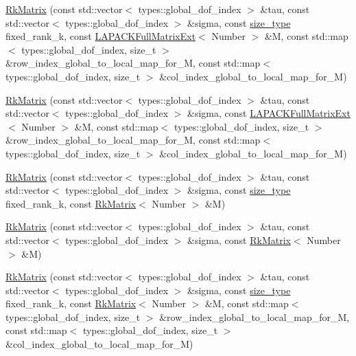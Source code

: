 \begin{DoxyCompactItemize}
\item 
\hyperlink{classRkMatrix_adf204b7ad92834e63c7f63f6b9ca59a9}{Rk\+Matrix} (const std\+::vector$<$ types\+::global\+\_\+dof\+\_\+index $>$ \&tau, const std\+::vector$<$ types\+::global\+\_\+dof\+\_\+index $>$ \&sigma, const \hyperlink{classRkMatrix_add060bfc3a4cc77f858c3d6dd58cadd5}{size\+\_\+type} fixed\+\_\+rank\+\_\+k, const \hyperlink{classLAPACKFullMatrixExt}{L\+A\+P\+A\+C\+K\+Full\+Matrix\+Ext}$<$ Number $>$ \&M, const std\+::map$<$ types\+::global\+\_\+dof\+\_\+index, size\+\_\+t $>$ \&row\+\_\+index\+\_\+global\+\_\+to\+\_\+local\+\_\+map\+\_\+for\+\_\+M, const std\+::map$<$ types\+::global\+\_\+dof\+\_\+index, size\+\_\+t $>$ \&col\+\_\+index\+\_\+global\+\_\+to\+\_\+local\+\_\+map\+\_\+for\+\_\+M)
\item 
\hyperlink{classRkMatrix_aee16f709a7a73d022add2f044cdcb26a}{Rk\+Matrix} (const std\+::vector$<$ types\+::global\+\_\+dof\+\_\+index $>$ \&tau, const std\+::vector$<$ types\+::global\+\_\+dof\+\_\+index $>$ \&sigma, const \hyperlink{classLAPACKFullMatrixExt}{L\+A\+P\+A\+C\+K\+Full\+Matrix\+Ext}$<$ Number $>$ \&M, const std\+::map$<$ types\+::global\+\_\+dof\+\_\+index, size\+\_\+t $>$ \&row\+\_\+index\+\_\+global\+\_\+to\+\_\+local\+\_\+map\+\_\+for\+\_\+M, const std\+::map$<$ types\+::global\+\_\+dof\+\_\+index, size\+\_\+t $>$ \&col\+\_\+index\+\_\+global\+\_\+to\+\_\+local\+\_\+map\+\_\+for\+\_\+M)
\item 
\hyperlink{classRkMatrix_aa5aff0d31115d7a67ef2f11db0b4ea24}{Rk\+Matrix} (const std\+::vector$<$ types\+::global\+\_\+dof\+\_\+index $>$ \&tau, const std\+::vector$<$ types\+::global\+\_\+dof\+\_\+index $>$ \&sigma, const \hyperlink{classRkMatrix_add060bfc3a4cc77f858c3d6dd58cadd5}{size\+\_\+type} fixed\+\_\+rank\+\_\+k, const \hyperlink{classRkMatrix}{Rk\+Matrix}$<$ Number $>$ \&M)
\item 
\hyperlink{classRkMatrix_a311b3ac28f647cb191eeb97a0b9d5815}{Rk\+Matrix} (const std\+::vector$<$ types\+::global\+\_\+dof\+\_\+index $>$ \&tau, const std\+::vector$<$ types\+::global\+\_\+dof\+\_\+index $>$ \&sigma, const \hyperlink{classRkMatrix}{Rk\+Matrix}$<$ Number $>$ \&M)
\item 
\hyperlink{classRkMatrix_a5a2841fc6a697007fafcab2619fc5390}{Rk\+Matrix} (const std\+::vector$<$ types\+::global\+\_\+dof\+\_\+index $>$ \&tau, const std\+::vector$<$ types\+::global\+\_\+dof\+\_\+index $>$ \&sigma, const \hyperlink{classRkMatrix_add060bfc3a4cc77f858c3d6dd58cadd5}{size\+\_\+type} fixed\+\_\+rank\+\_\+k, const \hyperlink{classRkMatrix}{Rk\+Matrix}$<$ Number $>$ \&M, const std\+::map$<$ types\+::global\+\_\+dof\+\_\+index, size\+\_\+t $>$ \&row\+\_\+index\+\_\+global\+\_\+to\+\_\+local\+\_\+map\+\_\+for\+\_\+M, const std\+::map$<$ types\+::global\+\_\+dof\+\_\+index, size\+\_\+t $>$ \&col\+\_\+index\+\_\+global\+\_\+to\+\_\+local\+\_\+map\+\_\+for\+\_\+M)

\end{DoxyCompactItemize}
